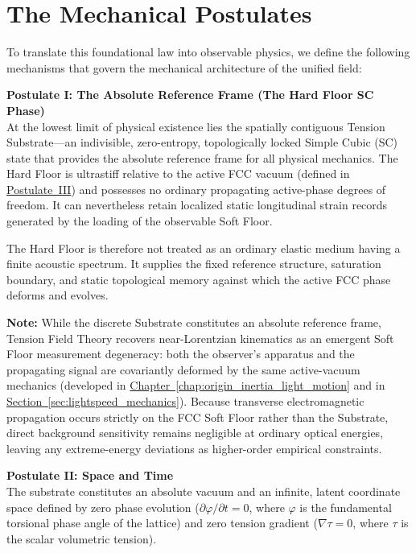 \section{The Mechanical Postulates}
\label{sec:2.2}
To translate this foundational law into observable physics, we define the following mechanisms that govern the mechanical architecture of the unified field:

\vspace{1.0em}
\label{postulate:one}
\noindent\textbf{Postulate I: The Absolute Reference Frame (The Hard Floor SC Phase)}\\
At the lowest limit of physical existence lies the spatially contiguous Tension Substrate---an indivisible, zero-entropy, topologically locked Simple Cubic (SC) state that provides the absolute reference frame for all physical mechanics. The Hard Floor is ultrastiff relative to the active FCC vacuum (defined in \hyperref[postulate:three]{Postulate~III}) and possesses no ordinary propagating active-phase degrees of freedom. It can nevertheless retain localized static longitudinal strain records generated by the loading of the observable Soft Floor.

The Hard Floor is therefore not treated as an ordinary elastic medium having a finite acoustic spectrum. It supplies the fixed reference structure, saturation boundary, and static topological memory against which the active FCC phase deforms and evolves.

\vspace{0.5em}
\noindent\textbf{Note:} While the discrete Substrate constitutes an absolute reference frame, Tension Field Theory recovers near-Lorentzian kinematics as an emergent Soft Floor measurement degeneracy: both the observer's apparatus and the propagating signal are covariantly deformed by the same active-vacuum mechanics (developed in \hyperref[chap:origin_inertia_light_motion]{Chapter~\ref*{chap:origin_inertia_light_motion}} and in \hyperref[sec:lightspeed_mechanics]{Section~\ref*{sec:lightspeed_mechanics}}). Because transverse electromagnetic propagation occurs strictly on the FCC Soft Floor rather than the Substrate, direct background sensitivity remains negligible at ordinary optical energies, leaving any extreme-energy deviations as higher-order empirical constraints.

\vspace{1.0em}
\label{postulate:two}
\noindent\textbf{Postulate II: Space and Time}\\
The substrate constitutes an absolute vacuum and an infinite, latent coordinate space defined by zero phase evolution ($\partial\varphi/\partial t = 0$, where $\varphi$ is the fundamental torsional phase angle of the lattice) and zero tension gradient ($\nabla\tau = 0$, where $\tau$ is the scalar volumetric tension). 

